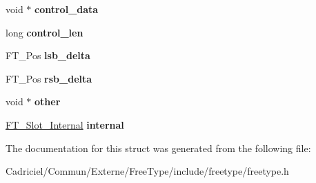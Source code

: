 \begin{DoxyCompactItemize}
\item 
\hypertarget{struct_f_t___glyph_slot_rec___a2af67814d985bcdfcffdf7e8a36ebbdf}{void $\ast$ {\bfseries control\-\_\-data}}\label{struct_f_t___glyph_slot_rec___a2af67814d985bcdfcffdf7e8a36ebbdf}

\item 
\hypertarget{struct_f_t___glyph_slot_rec___a7a088255cb09abe42f19f650f48b6b3f}{long {\bfseries control\-\_\-len}}\label{struct_f_t___glyph_slot_rec___a7a088255cb09abe42f19f650f48b6b3f}

\item 
\hypertarget{struct_f_t___glyph_slot_rec___a7d0d8c2eda28e38541e953186ecab89a}{F\-T\-\_\-\-Pos {\bfseries lsb\-\_\-delta}}\label{struct_f_t___glyph_slot_rec___a7d0d8c2eda28e38541e953186ecab89a}

\item 
\hypertarget{struct_f_t___glyph_slot_rec___a2ca5f5e7b92df3aee4584949fa6a2a1c}{F\-T\-\_\-\-Pos {\bfseries rsb\-\_\-delta}}\label{struct_f_t___glyph_slot_rec___a2ca5f5e7b92df3aee4584949fa6a2a1c}

\item 
\hypertarget{struct_f_t___glyph_slot_rec___ad0c5ab51842f178ba571bab2874f1bdb}{void $\ast$ {\bfseries other}}\label{struct_f_t___glyph_slot_rec___ad0c5ab51842f178ba571bab2874f1bdb}

\item 
\hypertarget{struct_f_t___glyph_slot_rec___a91731fd527eeab1d1acf3e1aea4bea84}{\hyperlink{struct_f_t___slot___internal_rec__}{F\-T\-\_\-\-Slot\-\_\-\-Internal} {\bfseries internal}}\label{struct_f_t___glyph_slot_rec___a91731fd527eeab1d1acf3e1aea4bea84}

\end{DoxyCompactItemize}


The documentation for this struct was generated from the following file\-:\begin{DoxyCompactItemize}
\item 
Cadriciel/\-Commun/\-Externe/\-Free\-Type/include/freetype/freetype.\-h\end{DoxyCompactItemize}
